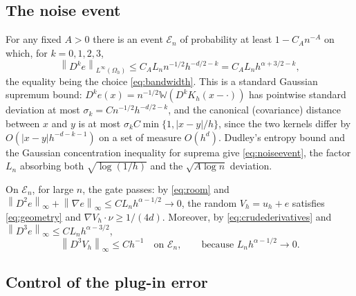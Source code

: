 \documentclass[12pt]{article}
\numberwithin{equation}{section}
\newcommand{\norm}[1]{\left\|#1\right\|}
\begin{document}
\subsection{The noise event}\label{sec:noise}

For any fixed $A>0$ there is an event $\mathcal E_n$ of probability at
least $1-C_An^{-A}$ on which, for $k=0,1,2,3$,
\begin{equation}\label{eq:noiseevent}
 \norm{D^ke}_{L^\infty(\Omega_h)}
 \le C_A L_n n^{-1/2}h^{-d/2-k}
 =C_A L_n h^{\alpha+3/2-k},
\end{equation}
the equality being the choice \eqref{eq:bandwidth}. This is a standard
Gaussian supremum bound: $D^ke(x)=n^{-1/2}\mathbb W(D^kK_h(x-\cdot))$
has pointwise standard deviation at most
$\sigma_k=Cn^{-1/2}h^{-d/2-k}$, and the canonical (covariance) distance
between $x$ and $y$ is at most $\sigma_kC\min\{1,|x-y|/h\}$, since the
two kernels differ by $O(|x-y|h^{-d-k-1})$ on a set of measure
$O(h^d)$. Dudley's entropy bound and the Gaussian concentration
inequality for suprema \cite[Section 2.3 and Theorem 2.5.8]{GN} give
\eqref{eq:noiseevent}, the factor $L_n$ absorbing both
$\sqrt{\log(1/h)}$ and the $\sqrt{A\log n}$ deviation.

On $\mathcal E_n$, for large $n$, the gate passes: by \eqref{eq:room}
and $\norm{D^2e}_\infty+\norm{\nabla e}_\infty\le CL_nh^{\alpha-1/2}\to0$,
the random $V_h=u_h+e$ satisfies \eqref{eq:geometry} and
$\nabla V_h\cdot\nu\ge1/(4d)$. Moreover, by \eqref{eq:crudederivatives}
and $\norm{D^3e}_\infty\le CL_nh^{\alpha-3/2}$,
\begin{equation}\label{eq:D3V}
 \norm{D^3V_h}_\infty\le Ch^{-1}\quad\text{on }\mathcal E_n,
 \qquad\text{because }L_nh^{\alpha-1/2}\to0 .
\end{equation}

\subsection{Control of the plug-in error}\label{sec:plugin}
\end{document}
